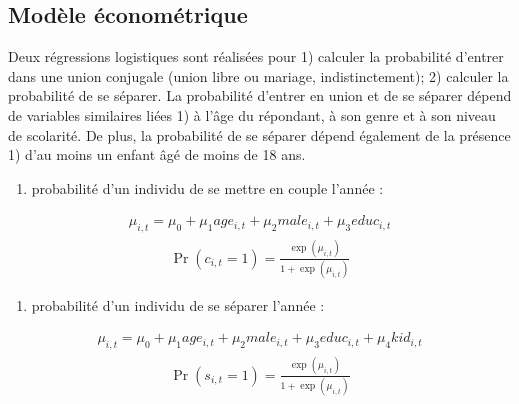 \documentclass[letterpaper,10pt,french]{sphinxmanual}
\begin{document}
\subsection{Modèle économétrique}
\label{\detokenize{methodologie:model3}}\label{\detokenize{methodologie:id7}}
Deux régressions logistiques sont réalisées pour 1) calculer la probabilité d’entrer dans une union conjugale (union libre ou mariage, indistinctement);
2) calculer la probabilité de se séparer. La probabilité d’entrer en union et de se séparer dépend de variables similaires liées
1) à l’âge du répondant, à son genre et à son niveau de scolarité. De plus, la probabilité de se séparer dépend également de la présence
1) d’au moins un enfant âgé de moins de 18 ans.
\begin{enumerate}
%
\item {} 
probabilité  d’un individu  de se mettre en couple l’année  :

\end{enumerate}
\begin{equation*}
\begin{split}\mu_{i,t} = \mu_{0} + \mu_{1} age_{i,t} + \mu_{2} male_{i,t} + \mu_{3} educ_{i,t}\end{split}
\end{equation*}\begin{equation*}
\begin{split}\Pr(c_{i,t}=1) = \frac{\exp(\mu_{i,t})}{1+\exp(\mu_{i,t})}\end{split}
\end{equation*}\begin{enumerate}
%
\setcounter{enumi}{1}
\item {} 
probabilité  d’un individu  de se séparer l’année  :

\end{enumerate}
\begin{equation*}
\begin{split}\mu_{i,t} = \mu_{0} + \mu_{1} age_{i,t} + \mu_{2} male_{i,t} + \mu_{3} educ_{i,t} + \mu_{4} kid_{i,t}\end{split}
\end{equation*}\begin{equation*}
\begin{split}\Pr(s_{i,t}=1) = \frac{\exp(\mu_{i,t})}{1+\exp(\mu_{i,t})}\end{split}
\end{equation*}
\end{document}
